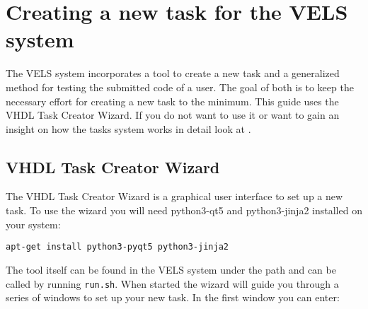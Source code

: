 \section{Creating a new task for the VELS system} \label{create_new_task}

The VELS system incorporates a tool to create a new task and a generalized method for testing the submitted code of a
user. The goal of both is to keep the necessary effort for creating a new task to the minimum. This guide uses the VHDL Task Creator Wizard. If you do not want to use it or want to gain an insight on how the tasks system works in detail look at .

\subsection{VHDL Task Creator Wizard} \label{sub:vhdltaskcreator}
The VHDL Task Creator Wizard is a graphical user interface to set up a new task. To use the wizard you will need python3-qt5 and python3-jinja2 installed on your system:
\begin{verbatim}
apt-get install python3-pyqt5 python3-jinja2
\end{verbatim}
The tool itself can be found in the VELS system under the path  and can be called by running \verb|run.sh|.
When started the wizard will guide you through a series of windows to set up your new task. In the first window you can enter:

